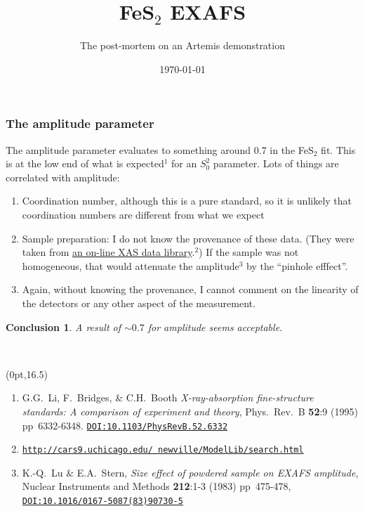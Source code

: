 \documentclass[10pt, xcolor=x11names, compress, handout]{beamer}
\title{FeS$_2$ EXAFS}%
\subtitle{The post-mortem on an Artemis demonstration}
\date{\today}
\newcommand{\fes}{FeS$_2$}
\newtheorem{conclusion}[theorem]{Conclusion}
\begin{document}
\maketitle


\begin{frame}
  \frametitle{The amplitude parameter}
  \small%
  The amplitude parameter evaluates to something around 0.7 in the
  {\fes} fit.  This is at the low end of what is expected$^1$ for an
  $S_0^2$ parameter.  Lots of things are correlated with amplitude:
  \begin{enumerate}
  \item Coordination number, although this is a pure standard, so it
    is unlikely that coordination numbers are different from what we
    expect
  \item Sample preparation: I do not know the provenance of these
    data.  (They were taken from
    \href{http://cars9.uchicago.edu/~newville/ModelLib/search.html}
    {\color{Blue4}an on-line XAS data library}.$^2$) If the sample was
    not homogeneous, that would attenuate the amplitude$^3$ by the
    ``pinhole efffect''.
  \item Again, without knowing the provenance, I cannot comment on the
    linearity of the detectors or any other aspect of the measurement.
  \end{enumerate}

  \begin{conclusion}
    A result of $\sim0.7$ for amplitude seems acceptable.
  \end{conclusion}

  \medskip

  ~

  \begin{textblock*}{0.9\linewidth}(0pt,16.5\TPVertModule)%
    \begin{enumerate}[1.]
    \tiny%
    \item G.G.\ Li, F.\ Bridges, \& C.H.\ Booth \textit{X-ray-absorption
      fine-structure standards: A comparison of experiment and
      theory}, Phys.\ Rev.\ B \textbf{52}:9 (1995) pp\ 6332-6348.
    \href{http://dx.doi.org/10.1103/PhysRevB.52.6332}
    {\color{Blue4}\texttt{DOI:10.1103/PhysRevB.52.6332}}
  \item \href{http://cars9.uchicago.edu/~newville/ModelLib/search.html}
    {\color{Blue4}\texttt{http://cars9.uchicago.edu/~newville/ModelLib/search.html}}
  \item K.-Q.\ Lu \& E.A.\ Stern, \textit{Size effect of powdered
      sample on EXAFS amplitude}, Nuclear Instruments and Methods
    \textbf{212}:1-3 (1983) pp\ 475-478, 
    \href{http://dx.doi.org/10.1016/0167-5087(83)90730-5}
    {\color{Blue4}\texttt{DOI:10.1016/0167-5087(83)90730-5}}
  \end{enumerate}
\end{textblock*}
  
\end{frame}
\end{document}
